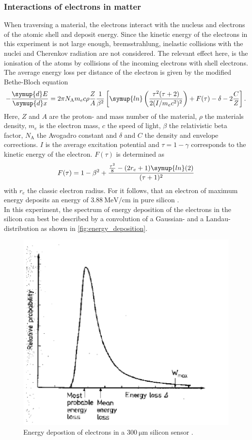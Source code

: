 \subsubsection{Interactions of electrons in matter}
When traversing a material, the electrons interact with the nucleus and electrons of the atomic shell and deposit energy. Since the kinetic energy of the electrons in this experiment
is not large enough, bremsstrahlung, inelastic collisions with the nuclei and Cherenkov radiation are not considered. The relevant effect here, is the ionisation of the atoms by 
collisions of the incoming electrons with shell electrons. The average energy loss per distance of the electron is given by the modified Bethe-Bloch equation \cite{Leo1987}
\begin{equation}
    -\frac{\symup{d}E}{\symup{d}x} = 2 \mathrm{\pi} N_\text{A} m_e c \rho \frac{Z}{A} \frac{1}{\beta^2}
    \left[ \symup{ln}\left(\frac{\tau^2(\tau +2)}{2(I/m_ec^2)^2}\right) + F(\tau) -\delta -2 \frac{C}{Z}\right].
    \label{eq:bethe_bloch}
\end{equation}
Here, $Z$ and $A$ are the proton- and mass number of the material, $\rho$ the materials density, $m_e$ is the electron mass, $c$ the speed of light, 
$\beta$ the relativistic beta factor, $N_\text{A}$ the Avogadro constant and $\delta$ and $C$ the density and envelope corrections. $I$ is the average excitation potential and 
$\tau = 1 - \gamma$ corresponds to the kinetic energy of the electron. $F(\tau)$ is determined as
\begin{equation*}
    F(\tau) = 1-\beta^2 + \frac{\frac{\tau^2}{8}- (2r_e + 1)\symup{ln}(2)}{(\tau+1)^2}
\end{equation*}
with $r_e$ the classic electron radius. For  it follows, that an electron of maximum energy deposits an energy of $\qty{3.88}{\mega\eV\per\cm}$ in pure 
silicon \cite{SiliconStrip}. \\
In this experiment, the spectrum of energy deposition of the electrons in the silicon can best be described by a convolution of a Gaussian- and a Landau- distribution as shown
in \autoref{fig:energy_deposition}.
\begin{figure}
    \centering 
    \includegraphics[width = .5\textwidth]{content/pics/energy_deposition.png}
    \caption{Energy depostion of electrons in a $\qty{300}{\micro\meter}$ silicon sensor \cite{SiliconStrip}.}
    \label{fig:energy_deposition}
\end{figure}

